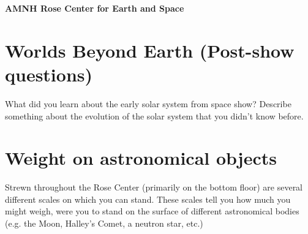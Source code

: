 \documentclass[12pt]{article}
\begin{document}
\setlength{\parskip}{8pt plus2pt minus2pt}

\begin{center}

\Large\textbf{AMNH Rose Center for Earth and Space}
\end{center}

\vspace{5 pt}

\section{Worlds Beyond Earth (Post-show questions)}

What did you learn about the early solar system from space show?  Describe something about the evolution of the solar system that you didn't know before.

\vspace{2.25in}


\section{Weight on astronomical objects}
Strewn throughout the Rose Center (primarily on the bottom floor) are several different scales on which you can stand.  These scales tell you how much you might weigh, were you to stand on the surface of different astronomical bodies (e.g. the Moon, Halley's Comet, a neutron star, etc.)  
\end{document}
